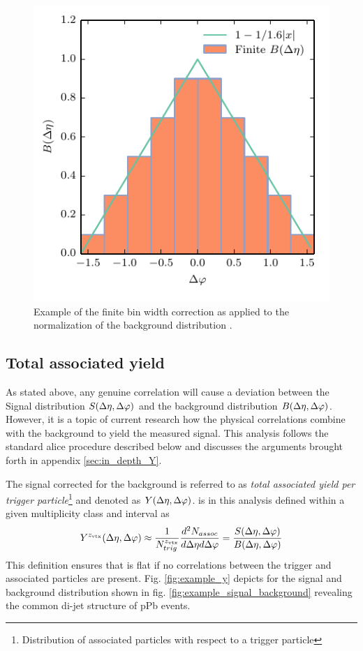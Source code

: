 \begin{figure}
  \centering
  \includegraphics[]{figures/finite_binwidth_correction.pdf}
  \caption{Example of the finite bin width correction as applied to the normalization of  the background distribution \B.}
  \label{fig:norm_bg}
\end{figure}

\subsection{Total associated yield}
\label{sec:total_yield}
As stated above, any genuine correlation will cause a deviation between the Signal distribution $S(\Delta\eta, \Delta\varphi)$ and the background distribution $B(\Delta\eta, \Delta\varphi)$. However, it is a topic of current research \cite{Schuster2013} how the physical  correlations combine with the background to yield the measured signal. This analysis follows the standard \gls{alice} procedure described below and discusses the arguments brought forth in appendix \ref{sec:in_depth_Y}.

The signal corrected for the background is referred to as \emph{total associated yield per trigger particle}\footnote{Distribution of associated particles with respect to a trigger particle} and denoted as $Y(\Delta\eta, \Delta\varphi)$. \Y is in this analysis defined within a given multiplicity class and \zvtx interval as
\begin{equation}
  \label{eq:total_yield}
  Y^{z_{\text{vtx}}}(\Delta\eta, \Delta\varphi) \approx
  \frac{1}{N^{z_{\text{vtx}}}_{trig}}\frac{d^2N_{assoc}}{d\Delta\eta d\Delta\varphi} =
  \frac{S(\Delta\eta, \Delta\varphi)}{B(\Delta\eta, \Delta\varphi)}
\end{equation}
This definition ensures that \Y is flat if no correlations between the trigger and associated particles are present. Fig. \ref{fig:example_y} depicts \Y for the signal and background distribution shown in fig. \ref{fig:example_signal_background} revealing the common di-jet structure of \gls{pPb} events.

